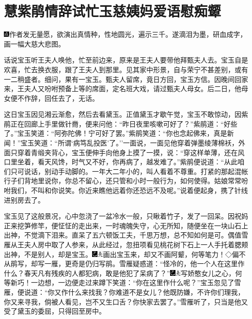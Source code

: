 
\chapter{慧紫鹃情辞试忙玉\hspace{.5em}慈姨妈爱语慰痴颦}

{\includegraphics[width=3mm]{../Images/00005}作者发无量愿，欲演出真情种，性地圆光，遍示三千。遂滴泪为墨，研血成字，画一幅大慈大悲图。}

话说宝玉听王夫人唤他，忙至前边来，原来是王夫人要带他拜甄夫人去。宝玉自是欢喜，忙去换衣服，跟了王夫人到那里。见其家中形景，自与荣宁不甚差别，或有一二稍盛者。细问，果有一宝玉。甄夫人留席，竟日方回，宝玉方信。因晚间回家来，王夫人又吩咐预备上等的席面，定名班大戏，请过甄夫人母女。后二日，他母女便不作辞，回任去了，无话。

这日宝玉因见湘云渐愈，然后去看黛玉。正值黛玉才歇午觉，宝玉不敢惊动，因紫鹃正在回廊上手里做针黹，便来问他：``昨日夜里咳嗽可好了？''紫鹃道：``好些了。''宝玉笑道：``阿弥陀佛！宁可好了罢。''紫鹃笑道：``你也念起佛来，真是新闻！''宝玉笑道：``所谓`病笃乱投医'了。''一面说，一面见他穿着弹墨绫薄棉袄，外面只穿着青缎夹背心，宝玉便伸手向他身上摸了一摸，说：``穿这样单薄，还在风口里坐着，看天风馋，时气又不好，你再病了，越发难了。''紫鹃便说道：``从此咱们只可说话，别动手动脚的。一年大二年小的，叫人看着不尊重。打紧的那起混帐行子们背地里说你，你总不留心，还只管和小时一般行为，如何使得。姑娘常常吩咐我们，不叫和你说笑。你近来瞧他远着你还恐远不及呢。''说着便起身，携了针线进别房去了。

宝玉见了这般景况，心中忽浇了一盆冷水一般，只瞅着竹子，发了一回呆。因祝妈正来挖笋修竿，便怔怔的走出来，一时魂魄失守，心无所知，随便坐在一块山石上出神，不觉滴下泪来。直呆了五六顿饭工夫，千思万想，总不知如何是可。偶值雪雁从王夫人房中取了人参来，从此经过，忽扭项看见桃花树下石上一人手托着腮颊出神，不是别人，却是宝玉。{\includegraphics[width=3mm]{../Images/00003}\includegraphics[width=3mm]{../Images/00012}\footnotesize \kaishu 画出宝玉来，却又不画阿颦，何等笔力！◇偏不从鹃写，却写一雁，更奇是仍归写鹃。}雪雁疑惑道：``怪冷的，他一个人在这里作什么？春天凡有残疾的人都犯病，敢是他犯了呆病了？''{\includegraphics[width=3mm]{../Images/00003}\includegraphics[width=3mm]{../Images/00012}\footnotesize \kaishu 写娇憨女儿之心，何等新巧！}一边想，一边便走过来蹲下笑道：``你在这里作什么呢？''宝玉忽见了雪雁，便说道：``你又作什么来找我？你难道不是女儿？他既防嫌，不许你们理我，你又来寻我，倘被人看见，岂不又生口舌？你快家去罢了。''雪雁听了，只当是他又受了黛玉的委屈，只得回至房中。

